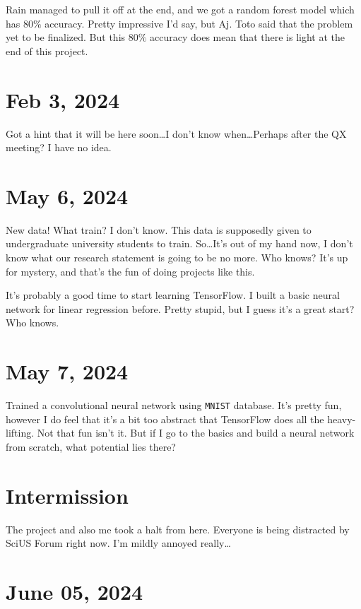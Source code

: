 Rain managed to pull it off at the end, and we got a random forest model which has $80\%$ accuracy. Pretty impressive I'd say, but Aj. Toto said that the problem yet to be finalized. But this $80\%$ accuracy does mean that there is light at the end of this project.

\section{Feb 3, 2024}

Got a hint that it will be here soon\dots I don't know when\dots Perhaps after the QX meeting? I have no idea.

\section{May 6, 2024}

New data! What train? I don't know. This data is supposedly given to undergraduate university students  to train. So\dots It's out of my hand now, I don't know what our research statement is going to be no more. Who knows? It's up for mystery, and that's the fun of doing projects like this.

It's probably a good time to start learning TensorFlow. I built a basic neural network for linear regression before. Pretty stupid, but I guess it's a great start? Who knows.

\section{May 7, 2024}

Trained a convolutional neural network using \texttt{MNIST} database. It's pretty fun, however I do feel that it's a bit too abstract that TensorFlow does all the heavy-lifting. Not that fun isn't it. But if I go to the basics and build a neural network from scratch, what potential lies there?

\section*{Intermission}

The project and also me took a halt from here. Everyone is being distracted by SciUS Forum right now. I'm mildly annoyed really\dots

\section{June 05, 2024}

